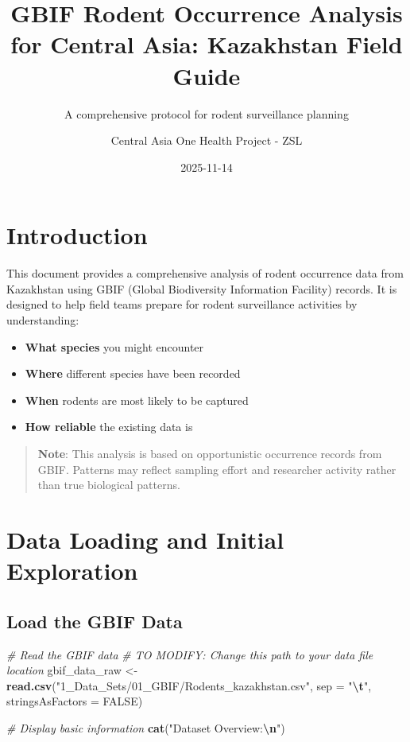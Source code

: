 \documentclass[
]{article}
\title{GBIF Rodent Occurrence Analysis for Central Asia: Kazakhstan
Field Guide}
\subtitle{A comprehensive protocol for rodent surveillance planning}
\author{Central Asia One Health Project - ZSL}
\date{2025-11-14}
\newenvironment{Shaded}{\begin{snugshade}}{\end{snugshade}}
\newcommand{\AttributeTok}[1]{\textcolor[rgb]{0.13,0.29,0.53}{#1}}
\newcommand{\CommentTok}[1]{\textcolor[rgb]{0.56,0.35,0.01}{\textit{#1}}}
\newcommand{\ConstantTok}[1]{\textcolor[rgb]{0.56,0.35,0.01}{#1}}
\newcommand{\FunctionTok}[1]{\textcolor[rgb]{0.13,0.29,0.53}{\textbf{#1}}}
\newcommand{\NormalTok}[1]{#1}
\newcommand{\OtherTok}[1]{\textcolor[rgb]{0.56,0.35,0.01}{#1}}
\newcommand{\SpecialCharTok}[1]{\textcolor[rgb]{0.81,0.36,0.00}{\textbf{#1}}}
\newcommand{\StringTok}[1]{\textcolor[rgb]{0.31,0.60,0.02}{#1}}
\providecommand{\tightlist}{%
  \setlength{\itemsep}{0pt}\setlength{\parskip}{0pt}}
\begin{document}
\maketitle

{
\setcounter{tocdepth}{3}
\tableofcontents
}
\section{Introduction}\label{introduction}

This document provides a comprehensive analysis of rodent occurrence
data from Kazakhstan using GBIF (Global Biodiversity Information
Facility) records. It is designed to help field teams prepare for rodent
surveillance activities by understanding:

\begin{itemize}
\tightlist
\item
  \textbf{What species} you might encounter
\item
  \textbf{Where} different species have been recorded
\item
  \textbf{When} rodents are most likely to be captured
\item
  \textbf{How reliable} the existing data is
\end{itemize}

\begin{quote}
\textbf{Note}: This analysis is based on opportunistic occurrence
records from GBIF. Patterns may reflect sampling effort and researcher
activity rather than true biological patterns.
\end{quote}

\section{Data Loading and Initial
Exploration}\label{data-loading-and-initial-exploration}

\subsection{Load the GBIF Data}\label{load-the-gbif-data}

\begin{Shaded}
\begin{Highlighting}[]
\CommentTok{\# Read the GBIF data}
\CommentTok{\# TO MODIFY: Change this path to your data file location}
\NormalTok{gbif\_data\_raw }\OtherTok{\textless{}{-}} \FunctionTok{read.csv}\NormalTok{(}\StringTok{"1\_Data\_Sets/01\_GBIF/Rodents\_kazakhstan.csv"}\NormalTok{, }
                          \AttributeTok{sep =} \StringTok{"}\SpecialCharTok{\textbackslash{}t}\StringTok{"}\NormalTok{, }
                          \AttributeTok{stringsAsFactors =} \ConstantTok{FALSE}\NormalTok{)}

\CommentTok{\# Display basic information}
\FunctionTok{cat}\NormalTok{(}\StringTok{"Dataset Overview:}\SpecialCharTok{\textbackslash{}n}\StringTok{"}\NormalTok{)}
\end{Highlighting}
\end{Shaded}
\end{document}
